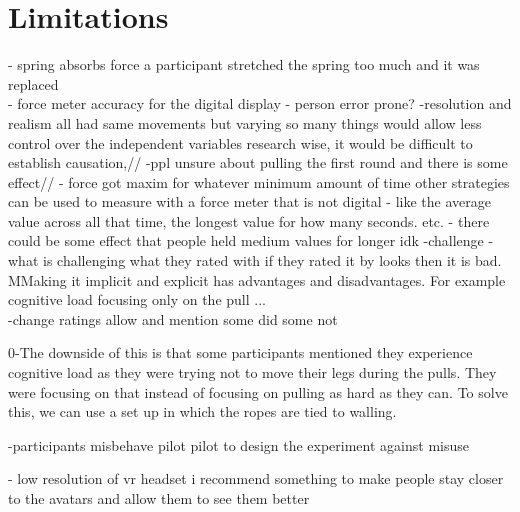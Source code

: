 \section{Limitations}
\label{section:limitations}
- spring absorbs force a participant stretched the spring too much and it was replaced\\
- force meter accuracy for the digital display
- person error prone?
-resolution and realism all had same movements but varying so many things would allow less control over the independent variables research wise, it would be difficult to establish causation,//
-ppl unsure about pulling the first round and there is some effect//
- force got maxim for whatever minimum amount of time other strategies can be used to measure with a force meter that is not digital - like the average value across all that time, the longest value for how many seconds. etc.
- there could be some effect that people held medium values for longer idk
-challenge - what is challenging what they rated with if they rated it by looks then it is bad. MMaking it implicit and explicit has advantages and disadvantages. For example cognitive load focusing only on the pull ...\\
-change ratings allow and mention some did some not

0-The downside of this is that some participants mentioned they experience cognitive load as they were trying not to move their legs during the pulls. They were focusing on that instead of focusing on pulling as hard as they can. To solve this, we can use a set up in which the ropes are tied to walling.

-participants misbehave pilot pilot to design the experiment against misuse

- low resolution of vr headset i recommend something to make people stay closer to the avatars  and allow them to see them better